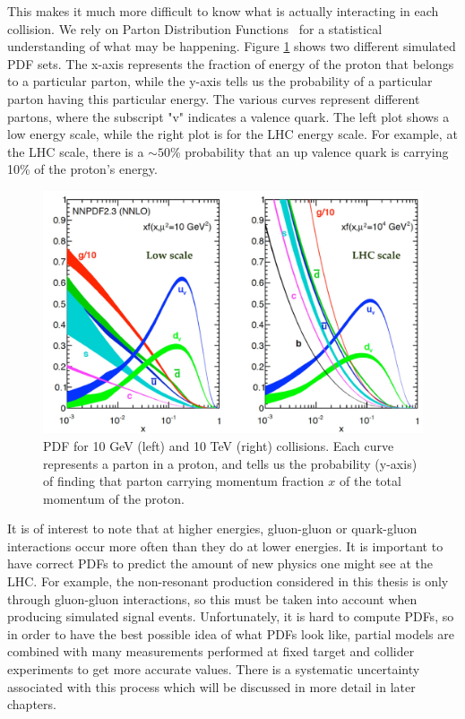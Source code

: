 This makes it much more difficult to know what is actually interacting in each collision. We rely on Parton Distribution Functions~\cite{Bourilkov:2006cj,Ball:2014uwa} for a statistical understanding of what may be happening. Figure \ref{Fig:Detect:PDFset} shows two different simulated PDF sets. The x-axis represents the fraction of energy of the proton that belongs to a particular parton, while the y-axis tells us the probability of a particular parton having this particular energy. The various curves represent different partons, where the subscript "v" indicates a valence quark. The left plot shows a low energy scale, while the right plot is for the LHC energy scale. For example, at the LHC scale, there is a $\sim50$\% probability that an up valence quark is carrying 10\% of the proton's energy. 
\begin{figure}[h!]
    \centering
        \includegraphics[width=\textwidth]{F3/PDFset}
        \caption{PDF for 10 GeV (left) and 10 TeV (right) collisions. Each curve represents a parton in a proton, and tells us the probability (y-axis) of finding that parton carrying momentum fraction $x$ of the total momentum of the proton.}
        \label{Fig:Detect:PDFset}
\end{figure}
It is of interest to note that at higher energies, gluon-gluon or quark-gluon interactions occur more often than they do at lower energies. It is important to have correct PDFs to predict the amount of new physics one might see at the LHC. For example, the non-resonant production considered in this thesis is only through gluon-gluon interactions, so this must be taken into account when producing simulated signal events. Unfortunately, it is hard to compute PDFs, so in order to have the best possible idea of what PDFs look like, partial models are combined with many measurements performed at fixed target and collider experiments to get more accurate values. There is a systematic uncertainty associated with this process which will be discussed in more detail in later chapters.

